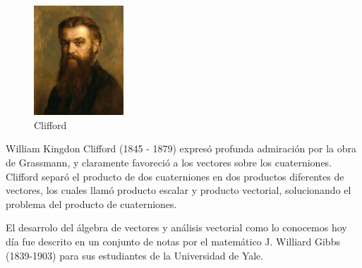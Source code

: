 \begin{figure}[!ht]
  \begin{center}
    \includegraphics[width=0.3\textwidth]{gfx/clifford}
  \end{center}
  \caption{Clifford}
\end{figure}

William Kingdon Clifford (1845 - 1879) expresó profunda admiración por la obra de Grassmann, y claramente
favoreció a los vectores sobre los cuaterniones. Clifford separó el producto de dos cuaterniones en dos
productos diferentes de vectores, los cuales llamó producto escalar y producto vectorial, solucionando
el problema del producto de cuaterniones.

El desarrolo del álgebra de vectores y análisis vectorial como lo conocemos hoy día fue descrito en un conjunto
de notas por el matemático J. Williard Gibbs (1839-1903) para sus estudiantes de la Universidad de Yale.





